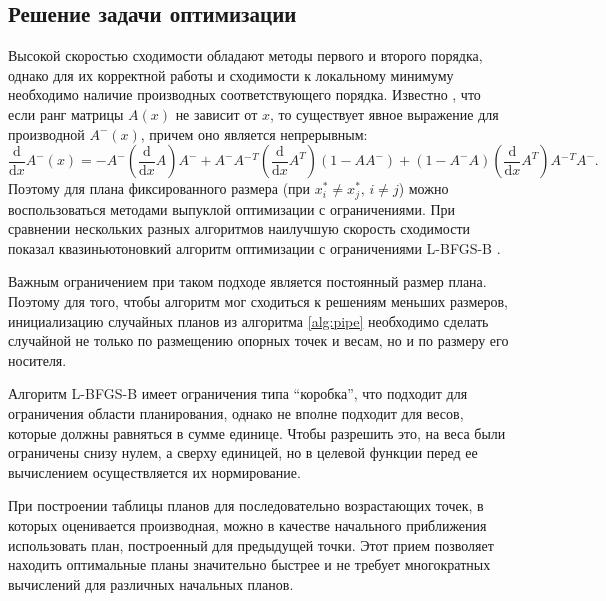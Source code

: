 \documentclass[specialist,
               substylefile = spbu.rtx,
               subf,href,colorlinks=true, 12pt]{disser}
\theoremstyle{definition}
\begin{document}
	\subsection{Решение задачи оптимизации}
	Высокой скоростью сходимости обладают методы первого и второго порядка, однако для их корректной работы и сходимости к локальному минимуму необходимо наличие производных соответствующего порядка. 
	Известно \cite{pinv_der}, что если ранг матрицы $A(x)$ не зависит от $x$, то существует явное выражение для производной $A^-(x)$, причем оно является непрерывным:
	\begin{equation*}
		\frac{\mathrm d}{\mathrm d x} A^-(x) =
 -A^- \left( \frac{\mathrm d}{\mathrm d x} A \right) A^-
+A^- A{^-}^T  \left( \frac{\mathrm d}{\mathrm d x} A^T \right) (1-A A^-)
+ (1-A^- A) \left( \frac{\mathrm d}{\mathrm d x} A^T \right) A{^-}^T A^-.
	\end{equation*}
	Поэтому для плана фиксированного размера (при $x_i^* \neq x_j^*, \, i \neq j$) можно воспользоваться методами выпуклой оптимизации с ограничениями. При сравнении нескольких разных алгоритмов наилучшую скорость сходимости показал квазиньютоновкий алгоритм оптимизации с ограничениями L-BFGS-B \cite{lbfgsb}.
	
	Важным ограничением при таком подходе является постоянный размер плана. Поэтому для того, чтобы алгоритм мог сходиться к решениям меньших размеров, инициализацию случайных планов из алгоритма \ref{alg:pipe} необходимо сделать случайной не только по размещению опорных точек и весам, но и по размеру его носителя.    
	
	Алгоритм L-BFGS-B имеет ограничения типа  ``коробка'', что подходит для ограничения области планирования, однако не вполне подходит для весов, которые должны равняться в сумме единице. Чтобы разрешить это, на веса были ограничены снизу нулем, а сверху единицей, но в целевой функции перед ее вычислением осуществляется их нормирование.
	
	При построении таблицы планов для последовательно возрастающих точек, в которых оценивается производная, можно в качестве начального приближения использовать план, построенный для предыдущей точки. Этот прием позволяет находить оптимальные планы значительно быстрее и не требует многократных вычислений для различных начальных планов.
\end{document}
